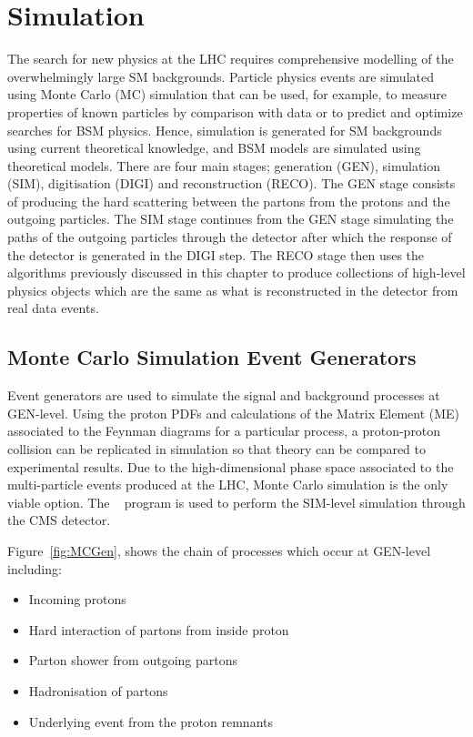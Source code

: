 
\chapter{Simulation}
The search for new physics at the LHC requires comprehensive modelling of the overwhelmingly large SM backgrounds. Particle physics events are simulated using Monte Carlo (MC) simulation that can be used, for example, to measure properties of known particles by comparison with data or to predict and optimize searches for BSM physics. Hence, simulation is generated for SM backgrounds using current theoretical knowledge, and BSM models are simulated using theoretical models.
There are four main stages; generation (GEN), simulation (SIM), digitisation (DIGI) and reconstruction (RECO). The GEN stage consists of producing the hard scattering between the partons from the protons and the outgoing particles. The SIM stage continues from the GEN stage simulating the paths of the outgoing particles through the detector after which the response of the detector is generated in the DIGI step. The RECO stage then uses the algorithms previously discussed in this chapter to produce collections of high-level physics objects which are the same as what is reconstructed in the detector from real data events.


\section{Monte Carlo Simulation Event Generators}

Event generators are used to simulate the signal and background processes at GEN-level. Using the proton PDFs and calculations of the Matrix Element (ME) associated to the Feynman diagrams for a particular process, a proton-proton collision can be replicated in simulation so that theory can be compared to experimental results. Due to the high-dimensional phase space associated to the multi-particle events produced at the LHC, Monte Carlo simulation is the only viable option. The \GEANTfour~\cite{GEANT4} program is used to perform the SIM-level simulation through the CMS detector. 

Figure~\ref{fig:MCGen}, shows the chain of processes which occur at GEN-level including:
\begin{itemize}
\item Incoming protons
\item Hard interaction of partons from inside proton
\item Parton shower from outgoing partons
\item Hadronisation of partons
\item Underlying event from the proton remnants 
\end{itemize}

